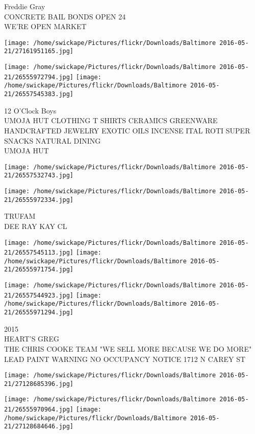 \documentclass[10pt,letterpaper]{article}
\begin{document}
Freddie Gray\\
CONCRETE BAIL BONDS OPEN 24\\
WE'RE OPEN MARKET
\pagebreak

\texttt{[image: /home/swickape/Pictures/flickr/Downloads/Baltimore 2016-05-21/27161951165.jpg]}

\vspace{0.25in}
\texttt{[image: /home/swickape/Pictures/flickr/Downloads/Baltimore 2016-05-21/26555972794.jpg]}
\texttt{[image: /home/swickape/Pictures/flickr/Downloads/Baltimore 2016-05-21/26557545383.jpg]}

12 O'Clock Boys\\
UMOJA HUT CLOTHING T SHIRTS CERAMICS GREENWARE HANDCRAFTED JEWELRY EXOTIC OILS INCENSE ITAL ROTI SUPER SNACKS NATURAL DINING\\
UMOJA HUT
\pagebreak

\texttt{[image: /home/swickape/Pictures/flickr/Downloads/Baltimore 2016-05-21/26557532743.jpg]}

\vspace{0.25in}
\texttt{[image: /home/swickape/Pictures/flickr/Downloads/Baltimore 2016-05-21/26555972334.jpg]}

TRUFAM\\
DEE RAY KAY CL
\pagebreak

\texttt{[image: /home/swickape/Pictures/flickr/Downloads/Baltimore 2016-05-21/26557545113.jpg]}
\texttt{[image: /home/swickape/Pictures/flickr/Downloads/Baltimore 2016-05-21/26555971754.jpg]}

\texttt{[image: /home/swickape/Pictures/flickr/Downloads/Baltimore 2016-05-21/26557544923.jpg]}
\texttt{[image: /home/swickape/Pictures/flickr/Downloads/Baltimore 2016-05-21/26555971294.jpg]}

2015\\
HEART'S GREG\\
THE CHRIS COOKE TEAM "WE SELL MORE BECAUSE WE DO MORE"\\
LEAD PAINT WARNING NO OCCUPANCY NOTICE 1712 N CAREY ST
\pagebreak

\texttt{[image: /home/swickape/Pictures/flickr/Downloads/Baltimore 2016-05-21/27128685396.jpg]}

\vspace{0.25in}
\texttt{[image: /home/swickape/Pictures/flickr/Downloads/Baltimore 2016-05-21/26555970964.jpg]}
\texttt{[image: /home/swickape/Pictures/flickr/Downloads/Baltimore 2016-05-21/27128684646.jpg]}
\end{document}
